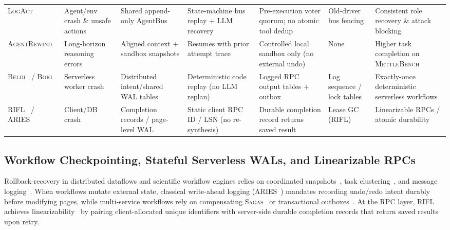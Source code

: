 \documentclass[10pt,journal]{IEEEtran}
\def\texttt#1{#1}%
\theoremstyle{definition}
\theoremstyle{remark}
\begin{document}
\begin{table}[!t]
{\begin{tabular}{@{}p{2.3cm}p{2.3cm}p{2.8cm}p{2.6cm}p{2.7cm}p{2.3cm}p{2.7cm}@{}}
\textsc{LogAct}~\cite{logact2026} & Agent/env crash \& unsafe actions & Shared append-only \texttt{AgentBus} & State-machine bus replay + LLM recovery & Pre-execution voter quorum; no atomic tool dedup & Old-driver bus fencing & Consistent role recovery \& attack blocking \\
\textsc{AgentRewind}~\cite{agentrewind2026} & Long-horizon reasoning errors & Aligned context + sandbox snapshots & Resumes with prior attempt trace & Controlled local sandbox only (no external undo) & None & Higher task completion on \textsc{MettleBench} \\
\textsc{Beldi}~\cite{zhang2020beldi} / \textsc{Boki}~\cite{jia2021boki} & Serverless worker crash & Distributed intent/shared WAL tables & Deterministic code replay (no LLM replan) & Logged RPC output tables + outbox & Log sequence / lock tables & Exactly-once deterministic serverless workflows \\
\textsc{RIFL}~\cite{lee2015rifl} / \textsc{ARIES}~\cite{mohan1992aries} & Client/DB crash & Completion records / page-level WAL & Static client RPC ID / LSN (no re-synthesis) & Durable completion record returns saved result & Lease GC (\textsc{RIFL}) & Linearizable RPCs / atomic durability \\
\bottomrule
\end{tabular}%
}
\end{table}

\subsection{Workflow Checkpointing, Stateful Serverless WALs, and Linearizable RPCs}
Rollback-recovery in distributed dataflows and scientific workflow engines relies on coordinated snapshots~\cite{chandy1985distributed,carbone2017flink}, task clustering~\cite{juve2013characterizing,deelman2015pegasus,chen2015faulttolerant}, and message logging~\cite{elnozahy2002survey,ferreiradasilva2017characterizing}. When workflows mutate external state, classical write-ahead logging (\textsc{ARIES}~\cite{mohan1992aries}) mandates recording undo/redo intent durably before modifying pages, while multi-service workflows rely on compensating \textsc{Sagas}~\cite{garciamolina1987sagas,ramamritham1996transactional,chang2025sagallm} or transactional outboxes~\cite{richardson2018microservices}. At the RPC layer, \textsc{RIFL}~\cite{lee2015rifl} achieves linearizability~\cite{herlihy1990linearizability} by pairing client-allocated unique identifiers with server-side durable completion records that return saved results upon retry.
\end{document}
